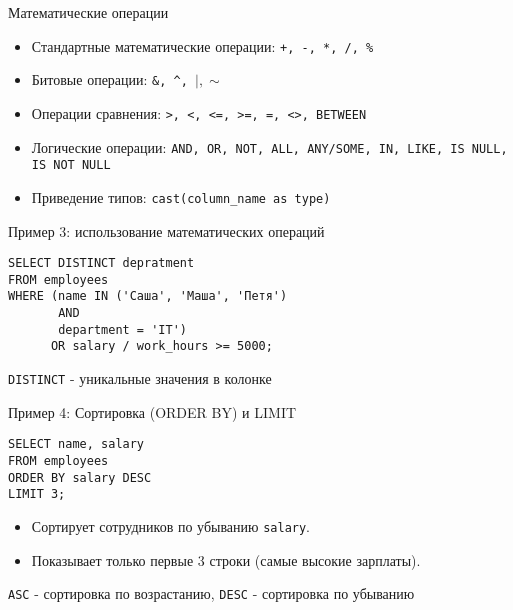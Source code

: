 \documentclass{beamer}
\begin{document}
\begin{frame}[fragile]{Математические операции}
	\begin{itemize}
		\item Стандартные математические операции: \texttt{+, -, *, /, \%}
		\item Битовые операции: \texttt{\&, \^ \;, $\vert, \sim$}
		\item Операции сравнения: \texttt{>, <, <=, >=, =, <>, BETWEEN}
		\item Логические операции: \texttt{AND, OR, NOT, ALL, ANY/SOME, IN, LIKE, IS NULL, IS NOT NULL}
		\item Приведение типов: \texttt{cast(column\_name as type)}
	\end{itemize}
\end{frame}

\begin{frame}[fragile]{Пример 3: использование математических операций}
	\begin{verbatim}
SELECT DISTINCT depratment
FROM employees
WHERE (name IN ('Саша', 'Маша', 'Петя')
       AND
       department = 'IT')
      OR salary / work_hours >= 5000;
    \end{verbatim}
	\texttt{DISTINCT} - уникальные значения в колонке
\end{frame}


\begin{frame}[fragile]{Пример 4: Сортировка (ORDER BY) и LIMIT}
	\begin{verbatim}
SELECT name, salary
FROM employees
ORDER BY salary DESC
LIMIT 3;
\end{verbatim}
	\begin{itemize}
		\item Сортирует сотрудников по убыванию \texttt{salary}.
		\item Показывает только первые 3 строки (самые высокие зарплаты).
	\end{itemize}
	\texttt{ASC} - сортировка по возрастанию, \texttt{DESC} - сортировка по убыванию
\end{frame}
\end{document}
